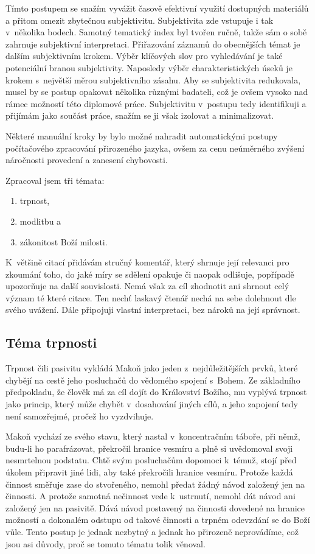 Tímto postupem se snažím vyvážit časově efektivní využití dostupných materiálů a
přitom omezit zbytečnou subjektivitu. Subjektivita zde vstupuje i tak v~několika
bodech. Samotný tematický index byl tvořen ručně, takže sám o sobě zahrnuje
subjektivní interpretaci. Přiřazování záznamů do obecnějších témat je dalším
subjektivním krokem. Výběr klíčových slov pro vyhledávání je také potenciální
branou subjektivity. Naposledy výběr charakteristických úseků je krokem
s~největší měrou subjektivního zásahu. Aby se subjektivita redukovala, musel by
se postup opakovat několika různými badateli, což je ovšem vysoko nad rámec
možností této diplomové práce. Subjektivitu v~postupu tedy identifikuji a
přijímám jako součást práce, snažím se ji však izolovat a minimalizovat.

Některé manuální kroky by bylo možné nahradit automatickými postupy počítačového
zpracování přirozeného jazyka, ovšem za cenu neúměrného zvýšení náročnosti
provedení a zanesení chybovosti.

Zpracoval jsem tři témata:
\begin{enumerate}
\item{trpnost,}
\item{modlitbu a}
\item{zákonitost Boží milosti.}
\end{enumerate}
K~většině citací přidávám stručný komentář, který shrnuje její relevanci pro
zkoumání toho, do jaké míry se sdělení opakuje či naopak odlišuje, popřípadě
upozorňuje na další souvislosti. Nemá však za cíl zhodnotit ani
shrnout celý význam té které citace. Ten nechť laskavý čtenář nechá na sebe
dolehnout dle svého uvážení. Dále připojuji vlastní interpretaci, bez nároků na
její správnost.

\subsection{Téma trpnosti}

Trpnost čili pasivitu vykládá Makoň jako jeden z~nejdůležitějších prvků, které
chybějí na cestě jeho posluchačů do vědomého spojení s~Bohem. Ze základního
předpokladu, že člověk má za cíl dojít do Království Božího, mu vyplývá trpnost
jako princip, který může chybět v~dosahování jiných cílů, a jeho zapojení tedy
není samozřejmé, pročež ho vyzdvihuje.

Makoň vychází ze svého stavu, který nastal v~koncentračním táboře, při němž,
budu-li ho parafrázovat, překročil hranice vesmíru a plně si uvědomoval svoji
nesmrtelnou podstatu. Chtě svým posluchačům dopomoci k~témuž, stojí před
úkolem připravit jiné lidi, aby také překročili hranice vesmíru. Protože každá
činnost směřuje zase do stvořeného, nemohl předat žádný návod založený jen na
činnosti. A protože samotná nečinnost vede k~ustrnutí, nemohl dát návod ani
založený jen na pasivitě. Dává návod postavený na činnosti dovedené na hranice
možností a dokonalém odstupu od takové činnosti a trpném odevzdání se do Boží
vůle. Tento postup je jednak nezbytný a jednak ho přirozeně neprovádíme, což
jsou asi důvody, proč se tomuto tématu tolik věnoval.

